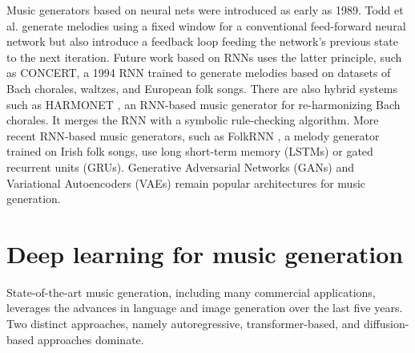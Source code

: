 Music generators based on neural nets were introduced as early as 1989. Todd et al. \cite{Todd_1989} generate melodies using a fixed window for a conventional feed-forward neural network but also introduce a feedback loop feeding the network's previous state to the next iteration. Future work based on RNNs uses the latter principle, such as CONCERT,\cite{Mozer_1994} a 1994 RNN trained to generate melodies based on datasets of Bach chorales, waltzes, and European folk songs. There are also hybrid systems such as HARMONET \cite{Hild_Feulner_Menzel_1991}, an RNN-based music generator for re-harmonizing Bach chorales. It merges the RNN with a symbolic rule-checking algorithm. More recent RNN-based music generators, such as FolkRNN \cite{Sturm_Ben-Tal_2016}, a melody generator trained on Irish folk songs, use long short-term memory (LSTMs) or gated recurrent units (GRUs). Generative Adversarial Networks (GANs) and Variational Autoencoders (VAEs) remain popular architectures for music generation. \cite{Civit_Civit-Masot_Cuadrado_Escalona_2022}

\section{Deep learning for music generation}
State-of-the-art music generation, including many commercial applications, leverages the advances in language and image generation over the last five years. Two distinct approaches, namely autoregressive, transformer-based, and diffusion-based approaches dominate.


